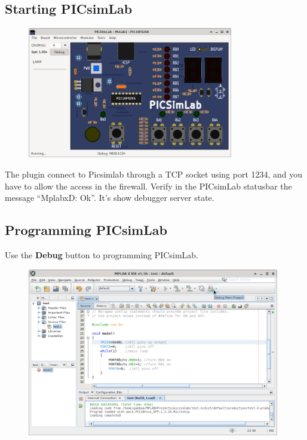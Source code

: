 \subsection{Starting PICsimLab}
\begin{figure}[H]
\center
\includegraphics[width=0.8\textwidth]{img/hmd/mplab24.png} 
\end{figure} 

The plugin connect to Picsimlab through a TCP socket using port 1234, and you have to allow the access in the firewall. Verify in the PICsimLab statusbar the message ``MplabxD: Ok''. It's show debugger server state.


\subsection{Programming PICsimLab}

Use the \textbf{Debug} button to programming PICsimLab.  
\begin{figure}[H]
\center
\includegraphics[width=0.98\textwidth]{img/hmd/mplab25.png} 
\end{figure} 

